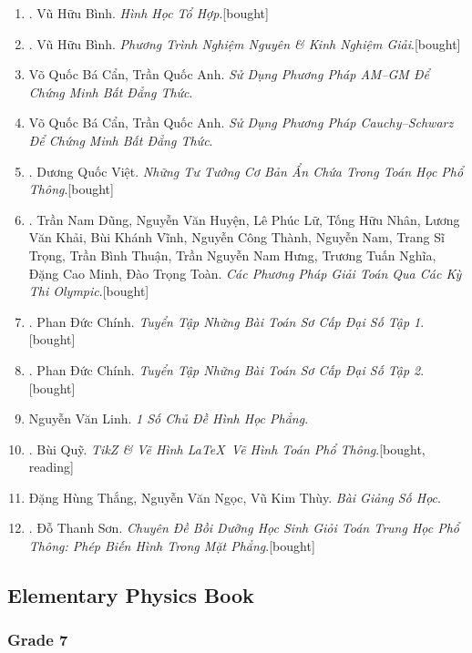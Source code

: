 \documentclass{article}
\begin{document}
\begin{enumerate}
	\item \cite{Binh_HHTH}. Vũ Hữu Bình. \textit{Hình Học Tổ Hợp}.\hfill\textsf{[bought]}
	\item \cite{Binh_PTNN}. Vũ Hữu Bình. \textit{Phương Trình Nghiệm Nguyên \& Kinh Nghiệm Giải}.\hfill\textsf{[bought]}
	\item Võ Quốc Bá Cẩn, Trần Quốc Anh. \textit{Sử Dụng Phương Pháp AM--GM Để Chứng Minh Bất Đẳng Thức}.
	\item Võ Quốc Bá Cẩn, Trần Quốc Anh. \textit{Sử Dụng Phương Pháp Cauchy--Schwarz Để Chứng Minh Bất Đẳng Thức}.
	\item \cite{Viet2014}. Dương Quốc Việt. \textit{Những Tư Tưởng Cơ Bản Ẩn Chứa Trong Toán Học Phổ Thông}.\hfill\textsf{[bought]}
	\item \cite{Dung_cac_phuong_phap_giai_toan_qua_cac_ky_thi_olympic_2022}. Trần Nam Dũng, Nguyễn Văn Huyện, Lê Phúc Lữ, Tống Hữu Nhân, Lương Văn Khải, Bùi Khánh Vĩnh, Nguyễn Công Thành, Nguyễn Nam, Trang Sĩ Trọng, Trần Bình Thuận, Trần Nguyễn Nam Hưng, Trương Tuấn Nghĩa, Đặng Cao Minh, Đào Trọng Toàn. \textit{Các Phương Pháp Giải Toán Qua Các Kỳ Thi Olympic}.\hfill\textsf{[bought]}
	\item \cite{Chinh2021_tap_1}. Phan Đức Chính. \textit{Tuyển Tập Những Bài Toán Sơ Cấp Đại Số Tập 1}.\hfill\textsf{[bought]}
	\item \cite{Chinh2021_tap_2}. Phan Đức Chính. \textit{Tuyển Tập Những Bài Toán Sơ Cấp Đại Số Tập 2}.\hfill\textsf{[bought]}
	\item Nguyễn Văn Linh. \textit{1 Số Chủ Đề Hình Học Phẳng}.
	\item \cite{Quy2022}. Bùi Quỹ. \textit{TikZ \& Vẽ Hình \LaTeX\ Vẽ Hình Toán Phổ Thông}.\hfill\textsf{[bought, reading]}
	\item Đặng Hùng Thắng, Nguyễn Văn Ngọc, Vũ Kim Thùy. \textit{Bài Giảng Số Học}.
	\item \cite{Son2006}. Đỗ Thanh Sơn. \textit{Chuyên Đề Bồi Dưỡng Học Sinh Giỏi Toán Trung Học Phổ Thông: Phép Biến Hình Trong Mặt Phẳng}.\hfill\textsf{[bought]}	
\end{enumerate}

\subsection{Elementary Physics Book}

\subsubsection{Grade 7}
\end{document}
